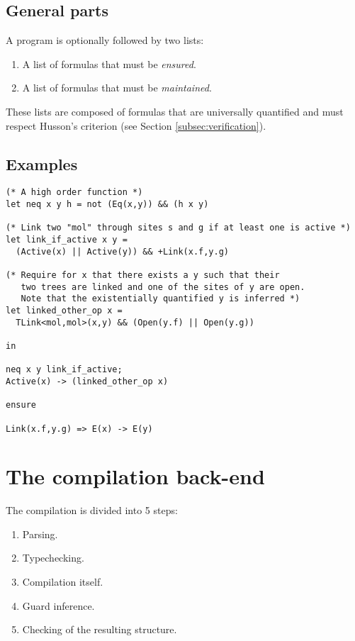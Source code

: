 \documentclass[10pt,a4paper]{article}
\begin{document}
\subsection{General parts}
A program is optionally followed by two lists:
\begin{enumerate}
\item A list of formulas that must be \emph{ensured}.
\item A list of formulas that must be \emph{maintained}.
\end{enumerate}

These lists are composed of formulas that are universally quantified and must respect Husson's criterion (see Section \ref{subsec:verification}).

\subsection{Examples}
\label{configex}
\begin{verbatim}
(* A high order function *)
let neq x y h = not (Eq(x,y)) && (h x y)

(* Link two "mol" through sites s and g if at least one is active *)
let link_if_active x y =
  (Active(x) || Active(y)) && +Link(x.f,y.g)

(* Require for x that there exists a y such that their
   two trees are linked and one of the sites of y are open.
   Note that the existentially quantified y is inferred *)
let linked_other_op x =
  TLink<mol,mol>(x,y) && (Open(y.f) || Open(y.g))

in

neq x y link_if_active;
Active(x) -> (linked_other_op x)

ensure

Link(x.f,y.g) => E(x) -> E(y)
\end{verbatim}


\section{The compilation back-end}
The compilation is divided into 5 steps:
\begin{enumerate}
\item Parsing.
\item Typechecking.
\item Compilation itself.
\item Guard inference.
\item Checking of the resulting structure.
\end{enumerate}
\end{document}
